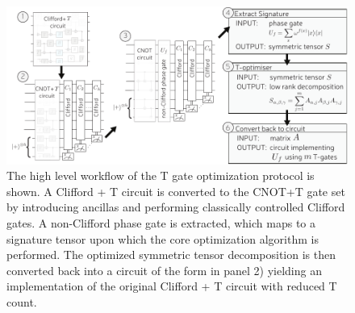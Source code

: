 \documentclass[notitlepage]{article}
\theoremstyle{definition}
\theoremstyle{problem}
\theoremstyle{lemma}
\begin{document}

\begin{figure}[h!]		
			\includegraphics{Overview3}
			\caption{The high level workflow of the T gate optimization protocol is shown. A Clifford + T circuit is converted to the CNOT+T gate set by introducing ancillas and performing classically controlled Clifford gates. A non-Clifford phase gate is extracted, which maps to a signature tensor upon which the core optimization algorithm is performed. The optimized symmetric tensor decomposition is then converted back into a circuit of the form in panel 2) yielding an implementation of the original Clifford + T circuit with reduced T count. }
			\label{fig_overview}
		\end{figure}
\end{document}
